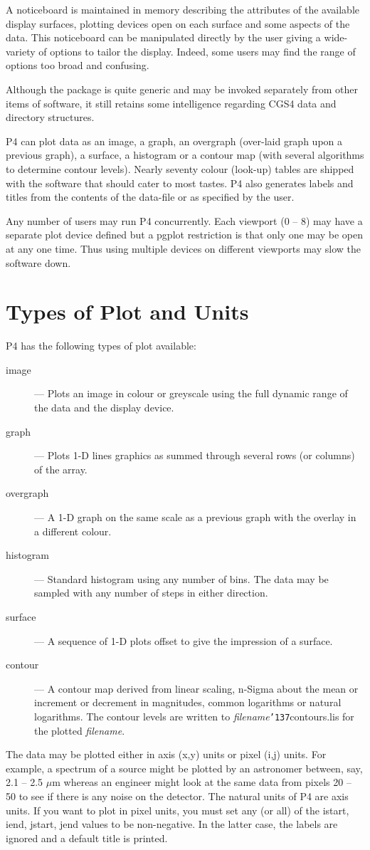 \documentclass[a4paper]{book}
\renewcommand{\_}{{\tt\char'137}}
\begin{document}
A noticeboard is maintained in memory describing the attributes of the available 
display surfaces, plotting devices open on each surface and some aspects of the data.
This noticeboard can be manipulated directly by the user giving a wide-variety
of options to tailor the display. Indeed, some users may find the range of 
options too broad and confusing.

Although the package is quite generic and may be invoked separately from other
items of software, it still retains some intelligence regarding CGS4 data and directory structures.

P4 can plot data as an image, a graph, an overgraph (over-laid graph upon
a previous graph), a surface, a histogram or a contour map (with several
algorithms to determine contour levels). Nearly seventy colour (look-up) tables are
shipped with the software that should cater to most tastes.
P4 also generates labels and titles from the contents of the data-file or
as specified by the user.

Any number of users may run P4 concurrently. Each viewport (0 -- 8)
may have a separate plot device defined but a {\sc pgplot} restriction is that only one may be
open at any one time. Thus using multiple devices on different viewports may
slow the software down.

\section{Types of Plot and Units}
P4 has the following types of plot available:
\begin{description}
\item[{\sc image}]--- Plots an image in colour or greyscale using the full dynamic range of the data and the display device.
\item[{\sc graph}]--- Plots 1-D lines graphics as summed through several rows (or columns) of the array.
\item[{\sc overgraph}]--- A 1-D graph on the same scale as a previous graph with the overlay in a different colour.
\item[{\sc histogram}]--- Standard histogram using any number of bins. The data may be sampled with any number of steps 
  in either direction.
\item[{\sc surface}]--- A sequence of 1-D plots offset to give the impression of a surface.
\item[{\sc contour}]--- A contour map derived from linear scaling, n-Sigma about the mean or increment or decrement in magnitudes,
  common logarithms or natural logarithms. The contour levels are written to {\em filename}\_contours.lis for the plotted
  {\em filename}.
\end{description}
The data may be plotted either in axis (x,y) units or pixel (i,j) units. For example, a spectrum of a source might
be plotted  by an astronomer between, say, 2.1 -- 2.5 $\mu$m whereas an engineer might look at the same data from pixels
20 -- 50 to see if there is any noise on the detector. The natural units of P4 are axis units. 
If you want to plot in pixel units, you must set any (or all) of the istart, iend, jstart, jend values to be
non-negative. In the latter case, the labels are ignored and a default title is printed.
\end{document}
